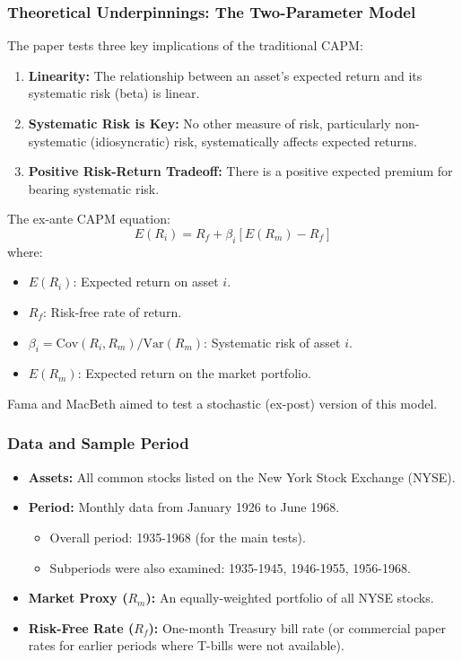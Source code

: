 \documentclass[10pt]{beamer}
\begin{document}
\begin{frame}
  \frametitle{Theoretical Underpinnings: The Two-Parameter Model}
  The paper tests three key implications of the traditional CAPM:
  \begin{enumerate}
    \item \textbf{Linearity:} The relationship between an asset's expected return and its systematic risk (beta) is linear.
    \item \textbf{Systematic Risk is Key:} No other measure of risk, particularly non-systematic (idiosyncratic) risk, systematically affects expected returns.
    \item \textbf{Positive Risk-Return Tradeoff:} There is a positive expected premium for bearing systematic risk.
  \end{enumerate}

  \bigskip
  The ex-ante CAPM equation:
  \[ E(R_i) = R_f + \beta_i [E(R_m) - R_f] \]
  where:
  \begin{itemize}
    \item $E(R_i)$: Expected return on asset $i$.
    \item $R_f$: Risk-free rate of return.
    \item $\beta_i = \text{Cov}(R_i, R_m) / \text{Var}(R_m)$: Systematic risk of asset $i$.
    \item $E(R_m)$: Expected return on the market portfolio.
  \end{itemize}
  Fama and MacBeth aimed to test a stochastic (ex-post) version of this model.
\end{frame}

\begin{frame}
  \frametitle{Data and Sample Period}
  \begin{itemize}
    \item \textbf{Assets:} All common stocks listed on the New York Stock Exchange (NYSE).
    \item \textbf{Period:} Monthly data from January 1926 to June 1968.
      \begin{itemize}
        \item Overall period: 1935-1968 (for the main tests).
        \item Subperiods were also examined: 1935-1945, 1946-1955, 1956-1968.
      \end{itemize}
    \item \textbf{Market Proxy ($R_m$):} An equally-weighted portfolio of all NYSE stocks.
    \item \textbf{Risk-Free Rate ($R_f$):} One-month Treasury bill rate (or commercial paper rates for earlier periods where T-bills were not available).
  \end{itemize}
\end{frame}
\end{document}
